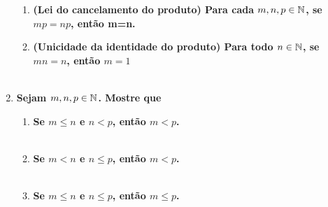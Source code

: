 \documentclass[%
  a4paper,%
  12pt,%
  fleqn,%
  english,%
  brazilian,%
]{article}
\begin{document}
\begin{enumerate}[wide, labelwidth=!, labelindent=0pt]
\begin{enumerate}[label=\alph*)]
      \item \textbf{(Lei do cancelamento do produto) Para cada $m,n,p \in \mathbb N$, se $mp=np$, então m=n.}
        \\
      
      \item \textbf{(Unicidade da identidade do produto) Para todo $n \in \mathbb N$, se $mn = n$, então $m = 1$}\\
        \\
  \end{enumerate} 
	  \vspace{3mm}

  \item \textbf{Sejam $m, n, p \in \mathbb N$. Mostre que}

  \begin{enumerate}[label=\alph*)]
    \item \textbf{Se $m \le n$ e $n < p$, então $m < p$.}\\
    \\
    \item \textbf{Se $m < n$ e $n \le p$, então $m < p$.}\\
    \\
    \item \textbf{Se $m \le n$ e $n \le p$, então $m \le p$.}\\
    \\
  \end{enumerate}
  
\end{enumerate}
\end{document}
